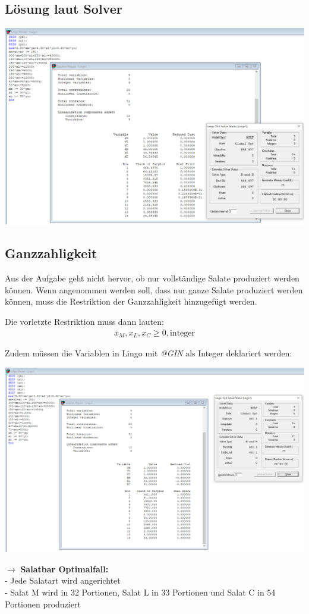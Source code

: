 \documentclass[a4paper,11pt]{article}
\begin{document}
\subsection*{Lösung laut Solver}
\begin{centering}
	\includegraphics[width=1\linewidth]{src/blatt_4_aufgabe_2_loesung_solver.PNG}
\end{centering}

\subsection*{Ganzzahligkeit}
Aus der Aufgabe geht nicht hervor, ob nur vollständige Salate produziert werden können. Wenn angenommen werden soll, dass nur ganze Salate produziert werden können, muss die Restriktion der Ganzzahligkeit hinzugefügt werden. \newline

Die vorletzte Restriktion muss dann lauten:
\begin{align*}
x_{M}, x_{L}, x_{C} \ge 0, \text{integer}
\end{align*}

Zudem müssen die Variablen in Lingo mit \textit{@GIN} als Integer deklariert werden:

\begin{centering}
	\includegraphics[width=1\linewidth]{src/ganzzahlig.png}
\end{centering}

$\to$ \textbf{Salatbar Optimalfall:} \\
- Jede Salatart wird angerichtet \\
- Salat M wird in 32 Portionen, Salat L in 33 Portionen und Salat C in 54 Portionen produziert
\end{document}
